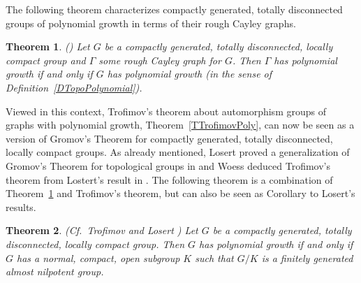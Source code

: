 \documentclass{emsprocart}
\newtheorem{theorem}{Theorem}[section]
\theoremstyle{definition}
\begin{document}
The following theorem characterizes compactly generated,
totally disconnected groups of polynomial growth in terms of
their rough Cayley graphs.

\begin{theorem}{\rm (\cite[Theorem~4.4]{KronMoller2008})}
\label{TopoPolynomial}
Let $G$ be a compactly generated, totally disconnected,
locally compact group and $\Gamma$
some rough Cayley graph for $G$.  Then $\Gamma$ has polynomial growth
if and only if $G$ has polynomial growth (in the sense of
Definition~\ref{DTopoPolynomial}).
\end{theorem}

Viewed in this context, Trofimov's theorem about automorphism groups of
graphs with polynomial growth, Theorem~\ref{TTrofimovPoly}, can now be
seen as a version of Gromov's Theorem for compactly generated, totally
disconnected, locally compact groups.
As already mentioned,  Losert  proved a generalization
of Gromov's Theorem for topological groups in \cite{Losert1987} and
Woess deduced Trofimov's theorem from Lostert's result
in \cite{Woess1992}.
The following theorem \cite[Theorem~4.6]{KronMoller2008} is a
combination of Theorem~\ref{TopoPolynomial} and Trofimov's theorem, but
can also be seen as Corollary to Losert's results.

\begin{theorem} {\rm (Cf.~Trofimov \cite{Trofimov1985} and Losert
    \cite{Losert1987})}
Let $G$ be a compactly generated, totally disconnected, locally compact
group.  Then $G$ has polynomial growth if and only if $G$ has a normal,
compact, open
subgroup $K$ such that $G/K$ is a finitely generated almost nilpotent group.
\end{theorem}
\end{document}
